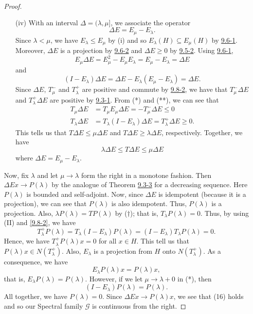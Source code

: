 \begin{proof}
\begin{enumerate}
    \item[(iv)] With an interval \( \Delta = (\lambda, \mu ] \), we associate the operator  
        \[  \Delta E = {E}_{\mu } - {E}_{\lambda}. \]
        Since \( \lambda < \mu   \), we have \( {E}_{\lambda} \leq {E}_{\mu } \) by (i) and so \( {E}_{\lambda}(H) \subseteq  {E}_{\mu  }(H)  \) by {\hyperref[9.6-1]{9.6-1}}. Moreover, \( \Delta E  \) is a projection by {\hyperref[9.6-2]{9.6-2}} and \( \Delta E \geq 0  \) by {\hyperref[9.5-2]{9.5-2}}. Using {\hyperref[9.6-1]{9.6-1}},     
        \[  {E}_{\mu } \Delta E = {E}_{\mu }^{2} - {E}_{\mu } {E}_{\lambda} = {E}_{\mu } - {E}_{\lambda} = \Delta E \tag{*} \]
        and
        \[  (I - {E}_{\lambda}) \Delta E = \Delta E - {E}_{\lambda} ({E}_{\mu  } - {E}_{\lambda}) = \Delta E. \tag{**} \]
        Since \( \Delta E  \), \( {T}_{\mu  }^{-}  \) and \( {T}_{\lambda}^{+} \) are positive and commute by {\hyperref[9.8-2]{9.8-2}}, we have that \( {T}_{\mu }^{-} \Delta E  \) and \( {T}_{\lambda}^{+} \Delta E  \) are positive by {\hyperref[9.3-1]{9.3-1}}. From (*) and (**), we can see that 
        \begin{align*}
            {T}_{\mu } \Delta E  &= {T}_{\mu } {E}_{\mu  } \Delta E = - {T}_{\mu }^{-} \Delta E \leq 0  \\
            {T}_{\lambda} \Delta E &= {T}_{\lambda} (I - {E}_{\lambda}) \Delta E = {T}_{\lambda}^{+} \Delta E  \geq 0.  
        \end{align*}
        This tells us that \( T\Delta E \leq \mu \Delta E  \) and \( T \Delta E \geq \lambda \Delta E  \), respectively. Together, we have 
        \[ \lambda \Delta E \leq T \Delta E \leq \mu \Delta E \tag{\( \dagger \)}   \]
        where \( \Delta E = {E}_{\mu  } - {E}_{\lambda} \).
\end{enumerate}

Now, fix \( \lambda  \) and let \( \mu  \to \lambda  \) form the right in a monotone fashion. Then \( \Delta E x \to P(\lambda) \) by the analogue of Theorem {\hyperref[9.3-3]{9.3-3}} for a decreasing sequence. Here \( P(\lambda) \) is bounded and self-adjoint. Now, since \( \Delta E  \) is idempotent (because it is a projection), we can see that \( P(\lambda) \) is also idempotent. Thus, \( P(\lambda) \) is a projection. Also, \( \lambda P(\lambda) = TP(\lambda) \) by (\( \dagger \)); that is, \( {T}_{\lambda} P(\lambda) = 0  \). Thus, by using (II) and {\hyperref[9.8-2]{[9.8-2]}}, we have 
\[  {T}_{\lambda}^{+} P(\lambda) = {T}_{\lambda}(I - {E}_{\lambda}) P(\lambda) = (I - {E}_{\lambda}) {T}_{\lambda} P(\lambda) = 0.  \]
Hence, we have \( {T}_{\lambda}^{+} P(\lambda) x = 0  \) for all \( x \in H  \).  This tell us that \( P(\lambda) x \in N ({T}_{\lambda}^{+}) \). Also, \( {E}_{\lambda} \) is a projection from \( H  \) onto \( N({T}_{\lambda}^{+}) \). As a consequence, we have 
\[  {E}_{\lambda}P(\lambda) x = P(\lambda) x,  \]
that is, \( {E}_{\lambda} P(\lambda) = P(\lambda) \). However, if we let \( \mu \to \lambda + 0  \) in (*), then 
\[  (I - {E}_{\lambda}) P(\lambda) = P(\lambda). \]
All together, we have \( P(\lambda) = 0  \). Since \( \Delta E x \to P(\lambda) x \), we see that (16) holds and so our Spectral family \( \mathcal{G} \) is continuous from the right.
\end{proof}  
